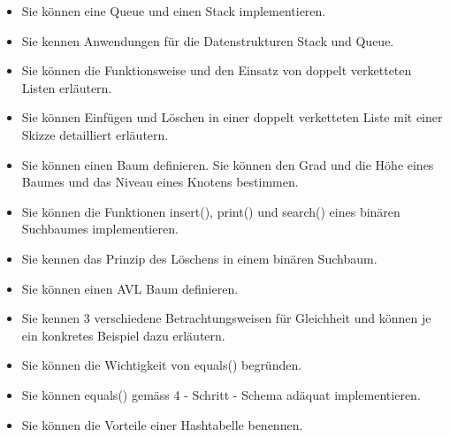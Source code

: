 \documentclass[a4paper, 10pt]{article}
\begin{document}
\begin{itemize}
  \item Sie können eine Queue und einen Stack implementieren. \\
        
  \item Sie kennen Anwendungen für die Datenstrukturen Stack und Queue. \\
        
  \item Sie können die Funktionsweise und den Einsatz von doppelt verketteten Listen erläutern. \\
        
  \item Sie können Einfügen und Löschen in einer doppelt verketteten Liste mit einer Skizze detailliert erläutern. \\
        
  \item Sie können einen Baum definieren. Sie können den Grad und die Höhe eines Baumes und das Niveau eines Knotens bestimmen. \\
        
  \item Sie können die Funktionen insert(), print() und search() eines binären Suchbaumes implementieren. \\
        
  \item Sie kennen das Prinzip des Löschens in einem binären Suchbaum. \\
        
  \item Sie können einen AVL Baum definieren. \\
        
  \item Sie kennen 3 verschiedene Betrachtungsweisen für Gleichheit und können je ein konkretes Beispiel dazu erläutern. \\
        
  \item Sie können die Wichtigkeit von equals() begründen. \\
        
  \item Sie können equals() gemäss 4 - Schritt - Schema adäquat implementieren. \\
        
  \item Sie können die Vorteile einer Hashtabelle benennen. \\
        

\end{itemize}
\end{document}
